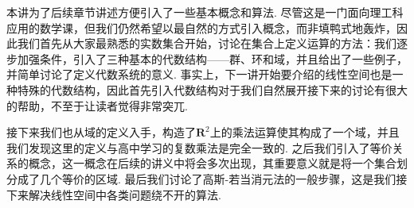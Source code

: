 \begin{summary}

    本讲为了后续章节讲述方便引入了一些基本概念和算法. 尽管这是一门面向理工科应用的数学课，但我们仍然希望以最自然的方式引入概念，而非填鸭式地轰炸，因此我们首先从大家最熟悉的实数集合开始，讨论在集合上定义运算的方法：我们逐步加强条件，引入了三种基本的代数结构——群、环和域，并且给出了一些例子，并简单讨论了定义代数系统的意义. 事实上，下一讲开始要介绍的线性空间也是一种特殊的代数结构，因此首先引入代数结构对于我们自然展开接下来的讨论有很大的帮助，不至于让读者觉得非常突兀.

    接下来我们也从域的定义入手，构造了$\mathbf{R}^2$上的乘法运算使其构成了一个域，并且我们发现这里的定义与高中学习的复数乘法是完全一致的. 之后我们引入了等价关系的概念，这一概念在后续的讲义中将会多次出现，其重要意义就是将一个集合划分成了几个等价的区域. 最后我们讨论了高斯-若当消元法的一般步骤，这是我们接下来解决线性空间中各类问题绕不开的算法.

\end{summary}

